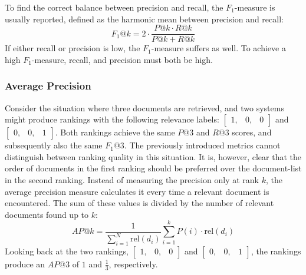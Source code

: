 To find the correct balance between precision and recall, the $F_1$-measure is usually reported, defined as the harmonic mean between precision and recall:
\begin{equation}
	\textit{F}_1@\textit{k}  = 2\cdot\frac{P@k \cdot R@k}{P@k + R@k} 
\end{equation}
If either recall or precision is low, the $F_1$-measure suffers as well. To achieve a high $F_1$-measure, recall, and precision must both be high.

\subsubsection{Average Precision}
Consider the situation where three documents are retrieved, and two systems might produce rankings with the following relevance labels: $\left[
\begin{smallmatrix}
	1, & 0, & 0
\end{smallmatrix}
\right]$ and $\left[
\begin{smallmatrix}
	0, & 0, & 1
\end{smallmatrix}
\right]$.
Both rankings achieve the same $P@3$ and $R@3$ scores, and subsequently also the same $F_1@3$. The previously introduced metrics cannot distinguish between ranking quality in this situation. It is, however, clear that the order of documents in the first ranking should be preferred over the document-list in the second ranking. 
Instead of measuring the precision only at rank $k$, the average precision measure calculates it every time a relevant document is encountered. The sum of these values is divided by the number of relevant documents found up to $k$:
\begin{equation}
	\textit{AP}@k = \frac{1}{\sum_{i=1}^N\text{rel}\left(d_i\right)}\sum^k_{i=1} P\left(i\right) \cdot \text{rel}\left(d_i\right)
\end{equation}
Looking back at the two rankings, 
$\left[
\begin{smallmatrix}
	1, & 0, & 0
\end{smallmatrix}
\right]$ and $\left[
\begin{smallmatrix}
	0, & 0, & 1
\end{smallmatrix}
\right]$, the rankings produce an $\textit{AP}@3$ of $1$ and $\frac{1}{3}$, respectively.

